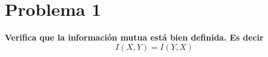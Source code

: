 \section*{Problema 1}
\textbf{Verifica que la información mutua está bien definida. Es decir}
\begin{equation*}
    I(X,Y)=I(Y,X)
\end{equation*}